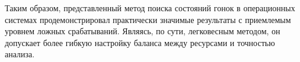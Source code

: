 Таким   образом,   представленный   метод   поиска  состояний  гонок   в
операционных системах продемонстрировал практически значимые результаты
с приемлемым уровнем ложных срабатываний. Являясь, по сути, легковесным
методом, он допускает более гибкую настройку баланса между ресурсами и
точностью анализа.
%
%
%
%

